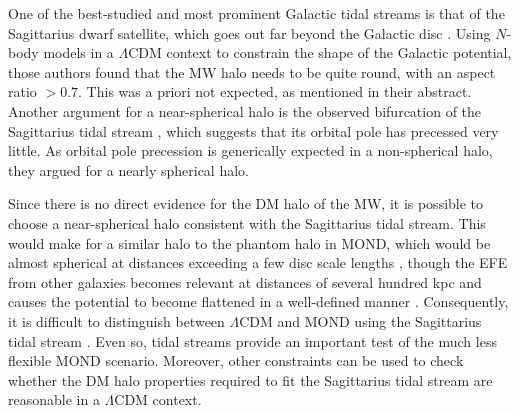 \documentclass[fleqn,usenatbib,useAMS,onecolumn]{mnras} %
\begin{document}
One of the best-studied and most prominent Galactic tidal streams is that of the Sagittarius dwarf satellite, which goes out far beyond the Galactic disc \citep{Ibata_2001}. Using $N$-body models in a $\Lambda$CDM context to constrain the shape of the Galactic potential, those authors found that the MW halo needs to be quite round, with an aspect ratio $>0.7$. This was a priori not expected, as mentioned in their abstract. Another argument for a near-spherical halo is the observed bifurcation of the Sagittarius tidal stream \citep{Fellhauer_2006}, which suggests that its orbital pole has precessed very little. As orbital pole precession is generically expected in a non-spherical halo, they argued for a nearly spherical halo.

Since there is no direct evidence for the DM halo of the MW, it is possible to choose a near-spherical halo consistent with the Sagittarius tidal stream. This would make for a similar halo to the phantom halo in MOND, which would be almost spherical at distances exceeding a few disc scale lengths \citep{Lughausen_2015}, though the EFE from other galaxies becomes relevant at distances of several hundred kpc and causes the potential to become flattened in a well-defined manner \citep[as discussed in Section~\ref{EFE_theory}; see also][]{Oria_2021}. Consequently, it is difficult to distinguish between $\Lambda$CDM and MOND using the Sagittarius tidal stream \citep{Read_2005}. Even so, tidal streams provide an important test of the much less flexible MOND scenario. Moreover, other constraints can be used to check whether the DM halo properties required to fit the Sagittarius tidal stream are reasonable in a $\Lambda$CDM context.
\end{document}
